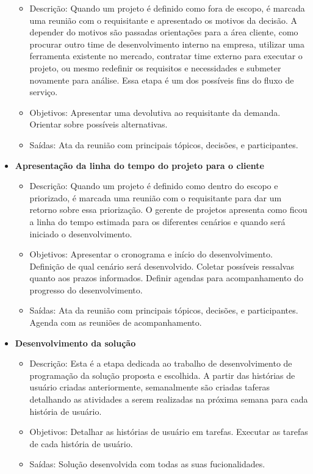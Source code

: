 \begin{itemize}
\begin{itemize}
			\item Descrição: Quando um projeto é definido como fora de escopo, é marcada uma reunião com o requisitante e apresentado 
			os motivos da decisão. A depender do motivos são passadas orientações para a área cliente, como procurar outro time de desenvolvimento interno na empresa,
			utilizar uma ferramenta existente no mercado, contratar time externo para executar o projeto, ou mesmo redefinir os requisitos e necessidades e submeter novamente para análise.
			Essa etapa é um dos possíveis fins do fluxo de serviço.
			\item Objetivos: Apresentar uma devolutiva ao requisitante da demanda. Orientar sobre possíveis alternativas.
			\item Saídas: Ata da reunião com principais tópicos, decisões, e participantes.
		\end{itemize}
		\item \textbf{Apresentação da linha do tempo do projeto para o cliente}
		\begin{itemize}
			\item Descrição: Quando um projeto é definido como dentro do escopo e priorizado, é marcada uma reunião com o requisitante
			para dar um retorno sobre essa priorização. O gerente de projetos apresenta como ficou a linha do tempo estimada para os diferentes cenários e quando será
			iniciado o desenvolvimento.
			\item Objetivos: Apresentar o cronograma e início do desenvolvimento. Definição de qual cenário será desenvolvido. Coletar possíveis ressalvas quanto aos prazos informados.
			Definir agendas para acompanhamento do progresso do desenvolvimento.
			\item Saídas: Ata da reunião com principais tópicos, decisões, e participantes. Agenda com as reuniões de acompanhamento.
		\end{itemize}
		\item \textbf{Desenvolvimento da solução}
		\begin{itemize}
			\item Descrição: Esta é a etapa dedicada ao trabalho de desenvolvimento de programação da solução proposta e escolhida. A partir das histórias de usuário
			criadas anteriormente, semanalmente são criadas taferas detalhando as atividades a serem realizadas na próxima semana para cada história de usuário.
			\item Objetivos: Detalhar as histórias de usuário em tarefas. Executar as tarefas de cada história de usuário.
			\item Saídas: Solução desenvolvida com todas as suas fucionalidades.

\end{itemize}
\end{itemize}

